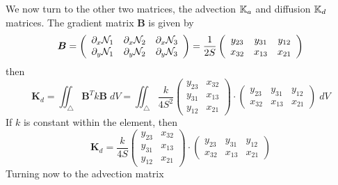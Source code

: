 We now turn to the other two matrices, the advection ${\mathbb{K}}_a$ and diffusion ${\mathbb{K}}_d$ matrices.
The gradient matrix ${\bm B}$ is given by 
\[
{\bm B} = 
\left(
\begin{array}{ccc}
\partial_x {\mathcal{N}}_1 & \partial_x {\mathcal{N}}_2 & \partial_x {\mathcal{N}}_3 \\
\partial_y {\mathcal{N}}_1 & \partial_y {\mathcal{N}}_2 & \partial_y {\mathcal{N}}_3 \\
\end{array}
\right)
=
\frac{1}{2S}
\left(
\begin{array}{ccc}
y_{23} & y_{31} & y_{12} \\
x_{32} & x_{13} & x_{21}
\end{array}
\right)
\]
then 
\[
{\bm K}_d 
= \iint_\triangle {\bm B}^T k {\bm B} \; dV
= \iint_\triangle \frac{k}{4S^2}
\left(
\begin{array}{cc}
y_{23} & x_{32} \\ 
y_{31} & x_{13} \\
y_{12} & x_{21}
\end{array}
\right)
\cdot
\left(
\begin{array}{ccc}
y_{23} & y_{31} & y_{12} \\
x_{32} & x_{13} & x_{21}
\end{array}
\right)
\; dV
\]
If $k$ is constant within the element, then 
\[
{\bm K}_d 
= \frac{k}{4S}
\left(
\begin{array}{cc}
y_{23} & x_{32} \\ 
y_{31} & x_{13} \\
y_{12} & x_{21}
\end{array}
\right)
\cdot
\left(
\begin{array}{ccc}
y_{23} & y_{31} & y_{12} \\
x_{32} & x_{13} & x_{21}
\end{array}
\right)
\]
Turning now to the advection matrix
